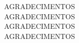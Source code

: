 \begin{agradecimentos}
\begin{flushright}
\parbox{0.65\linewidth}{
\itshape \flushright

AGRADECIMENTOS \\
\vspace{0.5 in}
AGRADECIMENTOS \\
\vspace{0.5cm}
AGRADECIMENTOS \\
\vspace{0.5cm}
AGRADECIMENTOS
}
\end{flushright}
\end{agradecimentos}
